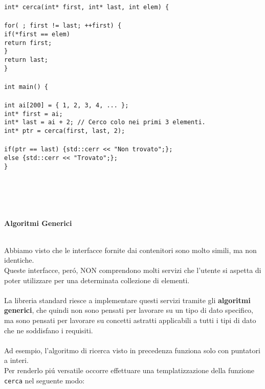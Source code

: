 \documentclass{article}
\newcommand\tab[1][1cm]{\hspace*{#1}}
\begin{document}
\texttt{int* cerca(int* first, int* last, int elem) \{ \\ \\ \tab for( ; first != last; ++first) \{ \\ \tab \tab if(*first == elem) \\ \tab \tab \tab return first; \\ \tab \} \\ \tab return last; \\ \} \\ \\ int main() \{ \\ \\ \tab int ai[200] = \{ 1, 2, 3, 4, ... \}; \\ \tab int* first = ai; \\ \tab int* last = ai + 2; // Cerco colo nei primi 3 elementi. \\ \tab int* ptr = cerca(first, last, 2); \\ \\ \tab if(ptr == last) \{std::cerr << "Non trovato";\}; \\ \tab else \{std::cerr << "Trovato";\}; \\ \} }
\\ \\ \\ \\ \\
\begin{large}\textbf{\textcolor{blu}{Algoritmi Generici}} \\ \\ \end{large}
Abbiamo visto che le interfacce fornite dai contenitori sono molto simili, ma non identiche.\\ Queste interfacce, per\'o, NON comprendono molti servizi che l'utente si aspetta di poter utilizzare per una determinata collezione di elementi.\\ \\La libreria standard riesce a implementare questi servizi tramite gli \textbf{algoritmi generici}, che quindi non sono pensati per lavorare su un tipo di dato specifico, ma sono pensati per lavorare su concetti astratti applicabili a tutti i tipi di dato che ne soddisfano i requisiti.\\ \\
Ad esempio, l'algoritmo di ricerca visto in precedenza funziona solo con puntatori a interi.\\Per renderlo pi\'u versatile occorre effettuare una templatizzazione della funzione \texttt{cerca} nel seguente modo: \\ \\
\end{document}
